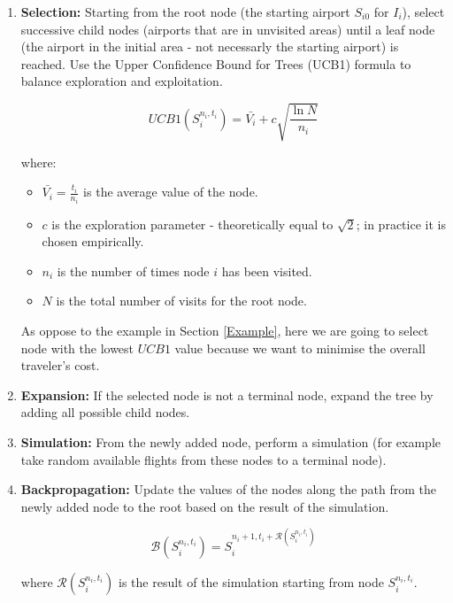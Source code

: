 \begin{enumerate}
    \item \textbf{Selection:} Starting from the root node (the starting airport $S_{i0}$ for $I_{i}$), select successive child nodes (airports that are in unvisited areas) until a leaf node (the airport in the initial area - not necessarly the starting airport) is reached. Use the Upper Confidence Bound for Trees (UCB1) formula to balance exploration and exploitation.
    
    \begin{equation}
        UCB1(S^{n_i,t_i}_i) = \bar{V_i} + c \sqrt{\frac{\ln N}{n_i}}
    \end{equation}
    
    where:
    \begin{itemize}
        \item $\bar{V_i} = \frac{t_i}{n_i}$ is the average value of the node.
        \item $c$ is the exploration parameter - theoretically equal to $\sqrt2$; in practice it is chosen empirically.
        \item $n_i$ is the number of times node $i$ has been visited.
        \item $N$ is the total number of visits for the root node.
    \end{itemize}
    
    As oppose to the example in Section \ref{Example}, here we are going to select node with the lowest $UCB1$ value because we want to minimise the overall traveler's cost.

    \item \textbf{Expansion:} If the selected node is not a terminal node, expand the tree by adding all possible child nodes.
    
    \item \textbf{Simulation:} From the newly added node, perform a simulation (for example take random available flights from these nodes to a terminal node).
    
    \item \textbf{Backpropagation:} Update the values of the nodes along the path from the newly added node to the root based on the result of the simulation.
    
    \begin{equation}
        \mathcal{B}(S^{n_i,t_i}_i) = S^{n_i+1,t_i+\mathcal{R}(S^{n_i,t_i}_i)}_i
    \end{equation}
    
    where $\mathcal{R}(S^{n_i,t_i}_i)$ is the result of the simulation starting from node $S^{n_i,t_i}_i$.
\end{enumerate}


